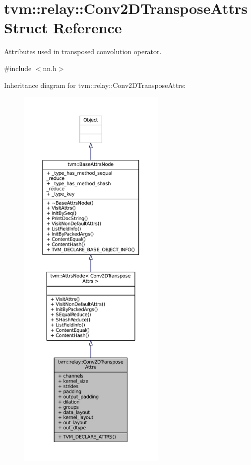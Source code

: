 \hypertarget{structtvm_1_1relay_1_1Conv2DTransposeAttrs}{}\section{tvm\+:\+:relay\+:\+:Conv2\+D\+Transpose\+Attrs Struct Reference}
\label{structtvm_1_1relay_1_1Conv2DTransposeAttrs}


Attributes used in transposed convolution operator.  




{\ttfamily \#include $<$nn.\+h$>$}



Inheritance diagram for tvm\+:\+:relay\+:\+:Conv2\+D\+Transpose\+Attrs\+:
\nopagebreak
\begin{figure}[H]
\begin{center}
\leavevmode
\includegraphics[height=550pt]{structtvm_1_1relay_1_1Conv2DTransposeAttrs__inherit__graph}
\end{center}
\end{figure}


